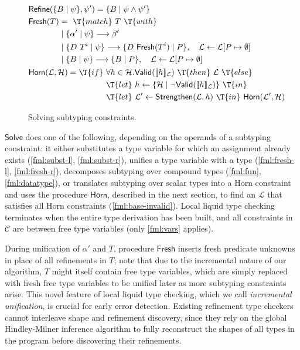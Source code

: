 \documentclass[10pt,preprint]{sigplanconf-pldi16}
\theoremstyle{definition}
\renewcommand{\And}{\wedge}
\newcommand{\refine}{\mathsf{Refine}}
\newcommand{\fresh}{\mathsf{Fresh}}
\newcommand{\solve}{\mathsf{Solve}}
\newcommand{\horn}{\mathsf{Horn}}
\newcommand{\strengthen}{\mathsf{Strengthen}}
\newcommand{\constraints}{\mathcal{C}}
\newcommand{\horns}{\mathcal{H}}
\newcommand{\liquidass}{\mathcal{L}}
\begin{document}
\begin{figure}
\begin{align}
\end{align}
\vspace{-7mm}
\begin{align*}
&\refine(\{B \mid \psi\}, \psi') = \{B \mid \psi\And\psi'\}\\
&\fresh(T) 
      \begin{aligned}[t]
      &=\ \T{match}\ T\ \T{with}\\      
      &\mid \{\alpha'\mid\psi\}\longrightarrow \beta' \\ &\mid\{D\ T^i \mid \psi\} \longrightarrow \{D\ \fresh(T^i) \mid P\},\quad\liquidass \gets \liquidass[P\mapsto \emptyset]\\ &\mid\{B \mid \psi\} \longrightarrow \{B \mid P\},\quad\liquidass \gets \liquidass[P\mapsto \emptyset]\end{aligned}\\
&\horn(\liquidass,\horns) = \T{if}\ \begin{aligned}[t]
                            &\forall h\in \horns. \mathsf{Valid}(\llbracket h\rrbracket_{\liquidass})\ \T{then}\ \liquidass\ \T{else}\\
                            &\T{let}\ h\gets \{\horns\mid \neg\mathsf{Valid}(\llbracket h\rrbracket_{\liquidass})\}\ \T{in}\\
                            &\T{let}\ \liquidass'\gets \strengthen(\liquidass, h)\ \T{in}\ \horn(\liquidass',\horns)
                            \end{aligned}
\end{align*}
\caption{Solving subtyping constraints.}\label{fig:solve}
\end{figure}

$\solve$ does one of the following, depending on the operands of a subtyping constraint:
it either substitutes a type variable for which an assignment already exists (\autoref{fml:subst-l}, \autoref{fml:subst-r}),
unifies a type variable with a type (\autoref{fml:fresh-l}, \autoref{fml:fresh-r}),
decomposes subtyping over compound types (\autoref{fml:fun}, \autoref{fml:datatype}),
or translates subtyping over scalar types into a Horn constraint 
and uses the procedure $\horn$, described in the next section, to find an $\liquidass$ that satisfies all Horn constraints (\autoref{fml:base-invalid}).
Local liquid type checking terminates when the entire type derivation has been built,
and all constraints in $\constraints$ are between free type variables (only \autoref{fml:vars} applies).

During unification of $\alpha'$ and $T$, procedure $\fresh$ inserts fresh predicate unknowns in place of all refinements in $T$;
note that due to the incremental nature of our algorithm,
$T$ might itself contain free type variables, which are simply replaced with fresh free type variables
to be unified later as more subtyping constraints arise.
This novel feature of local liquid type checking, which we call \emph{incremental unification}, 
is crucial for early error detection.
Existing refinement type checkers~\cite{Flanagan06,RondonKaJh08} cannot interleave shape and refinement discovery,
since they rely on the global Hindley-Milner inference algorithm to fully reconstruct the shapes of all types in the program
before discovering their refinements.
\end{document}
